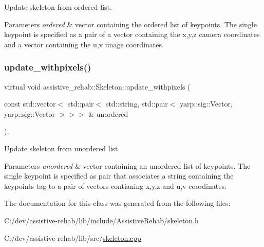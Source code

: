 Update skeleton from ordered list. 


\begin{DoxyParams}{Parameters}
{\em ordered} & vector containing the ordered list of keypoints. The single keypoint is specified as a pair of a vector containing the x,y,z camera coordinates and a vector containing the u,v image coordinates. \\
\hline
\end{DoxyParams}
\mbox{\label{classassistive__rehab_1_1Skeleton_a36e9dfd4910120025e40ccc3d03c0e01}} 
\subsubsection{\texorpdfstring{update\_withpixels()}{update\_withpixels()}\hspace{0.1cm}{\footnotesize\ttfamily [2/2]}}
{\footnotesize\ttfamily virtual void assistive\+\_\+rehab\+::\+Skeleton\+::update\+\_\+withpixels (\begin{DoxyParamCaption}\item[{const std\+::vector$<$ std\+::pair$<$ std\+::string, std\+::pair$<$ yarp\+::sig\+::\+Vector, yarp\+::sig\+::\+Vector $>$$>$$>$ \&}]{unordered }\end{DoxyParamCaption})\hspace{0.3cm}{\ttfamily [virtual]}, {\ttfamily [inherited]}}



Update skeleton from unordered list. 


\begin{DoxyParams}{Parameters}
{\em unordered} & vector containing an unordered list of keypoints. The single keypoint is specified as pair that associates a string containing the keypoint\textquotesingle{}s tag to a pair of vectors contianing x,y,z and u,v coordinates. \\
\hline
\end{DoxyParams}


The documentation for this class was generated from the following files\+:\begin{DoxyCompactItemize}
\item 
C\+:/dev/assistive-\/rehab/lib/include/\+Assistive\+Rehab/skeleton.\+h\item 
C\+:/dev/assistive-\/rehab/lib/src/\mbox{\hyperlink{skeleton_8cpp}{skeleton.\+cpp}}\end{DoxyCompactItemize}
